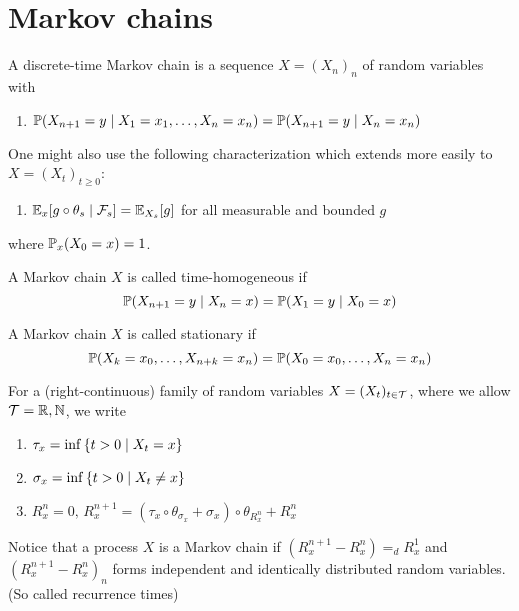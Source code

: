 \section{Markov chains}


\begin{defn}
  A discrete-time Markov chain is a sequence $X=(X_n)_n$ of random variables with 
  \begin{enumerate}
    \item \(\mathbb{P}(X_{n+1}=y \; \vert \;  X_1=x_1, \dots, X_n=x_n) = \mathbb{P}(X_{n+1}=y \; \vert \; X_n=x_n)\)
  \end{enumerate}
  One might also use the following characterization which extends more easily to \(X=(X_t)_{t\geq 0}\): 
  \begin{enumerate}
    \item $\mathbb{E}_x[g\circ \theta_s \; \vert \; \mathcal{F}_s] = \mathbb{E}_{X_s}[g]$ for all measurable and bounded $g$
  \end{enumerate}
  where $\mathbb{P}_x(X_0=x)=1$.
\end{defn}


\begin{defn}
    A Markov chain $X$ is called time-homogeneous if 
    \[\mathbb{P}(X_{n+1}=y \; \vert \; X_n=x) = \mathbb{P}(X_1=y \; \vert \; X_0=x)\]
\end{defn}

\begin{defn}[Stationarity]
    A Markov chain $X$ is called stationary if 
    \[\mathbb{P}( X_{k}=x_0, \dots, X_{n+k}=x_n) = \mathbb{P}(X_0=x_0, \dots , X_n=x_n)\]
\end{defn}




\begin{defn}
  For a (right-continuous) family of random variables $X=(X_t)_{t\in \mathcal{T}}$, where we allow $\mathcal{T}=\mathbb{R}, \mathbb{N}$, we write 
  \begin{enumerate}
    \item \(\tau_x = \inf \left\{ {t>0 \; \vert \; X_t=x} \right\}\)
    \item \(\sigma_x = \inf \left\{ {t>0 \; \vert \; X_t \neq x} \right\}\)
    \item $R_x^n=0, \, R_x^{n+1} = (\tau_x \circ \theta_{\sigma_x}+\sigma_x)\circ \theta_{R_x^{n}}+R_x^n$
  \end{enumerate}
  Notice that a process $X$ is a Markov chain if $(R_x^{n+1}-R_x^n) =_d R_x^1$ and $(R_x^{n+1}-R_x^n)_n$ forms independent and identically distributed random variables. (So called recurrence times)
\end{defn}


